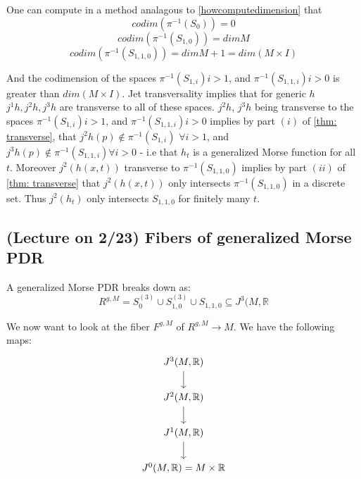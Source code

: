 \documentclass{article}
\newtheorem{proposed work}[theorem]{Proposed Work}
\begin{document}
One can compute in a method analagous to \ref{howcomputedimension} that 
\[codim (\pi^{-1}(S_{0}))=0 \]
\[codim (\pi^{-1}(S_{1,0}))=dim M \]
\[codim (\pi^{-1}(S_{1,1,0}))=dim M+1=dim(M \times I) \]
 
And the codimension of the spaces
$\pi^{-1}(S_{1,i}) i>1$, and $ \pi^{-1}(S_{1,1,i}) i>0$ is greater than $dim(M \times I)$.  Jet transversality implies that for generic $h$ $j^1h, j^2h, j^3h$ are transverse to all of these spaces.   $j^2h$, $j^3h$ being transverse to the spaces $\pi^{-1}(S_{1,i}) i>1$, and $ \pi^{-1}(S_{1,1,i}) i>0$  implies by part $(i)$ of \ref{thm: transverse}, that $j^2 h(p) \notin \pi^{-1}(S_{1,i})$ $\forall i>1$, and $j^3 h(p) \notin \pi^{-1}(S_{1,1,i}) \forall i>0$ - i.e that $h_t$ is a generalized Morse function for all $t$.   Moreover $j^2(h(x,t))$ transverse to $\pi^{-1}(S_{1,1,0})$ implies by part $(ii)$ of  \ref{thm: transverse} that $j^2(h(x,t))$ only intersects $\pi^{-1}(S_{1,1,0})$ in a discrete set.  Thus $j^2(h_t)$ only intersects $S_{1,1,0}$ for finitely many $t$.

\subsection{(Lecture on 2/23) Fibers of generalized Morse PDR}
A generalized Morse PDR breaks down as:
$$ R^{g,M}=S_0^{(3)}\cup S_{1,0}^{(3)}\cup S_{1,1,0}\subseteq J^3(M, \mathbb{R}$$

We now want to look at the fiber $F^{g,M}$ of $R^{g,M}\to M$. We have the following maps:
\begin{equation*}
\begin{tikzcd}
J^3(M,\R)\arrow[d]\\
J^2(M,\R)\arrow[d]\\
J^1(M,\R)\arrow[d]\\
J^0(M,\R)=M\times \R
\end{tikzcd}
\end{equation*}
\end{document}
